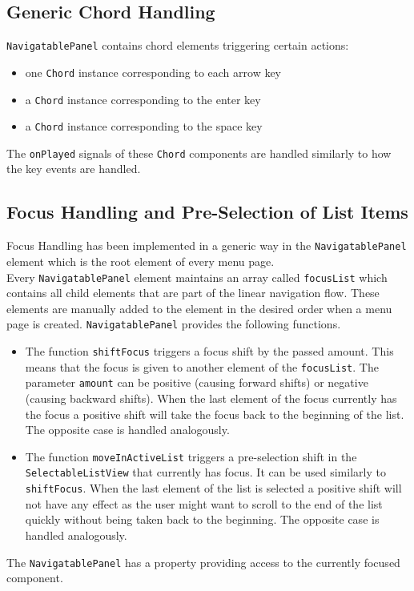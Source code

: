 \subsection{Generic Chord Handling}
{\tt NavigatablePanel} contains chord elements triggering certain actions: 
\begin {itemize}
	\item {one {\tt Chord} instance corresponding to each arrow key}
	\item {a {\tt Chord} instance corresponding to the enter key}
	\item {a {\tt Chord} instance corresponding to the space key}
\end {itemize}
The {\tt onPlayed} signals of these {\tt Chord} components are handled similarly to how the key events are handled.
\subsection{Focus Handling and Pre-Selection of List Items}
Focus Handling has been implemented in a generic way in the {\tt NavigatablePanel} element which is the root element of every menu page. \\
Every {\tt NavigatablePanel} element maintains an array called {\tt focusList} which contains all child elements that are part of the linear navigation flow. These elements are manually added to the element in the desired order when a menu page is created.
{\tt NavigatablePanel} provides the following functions.
\begin {itemize}
	\item {
		The function {\tt shiftFocus} triggers a focus shift by the passed amount. This means that the focus is given to another element of the {\tt focusList}. The parameter {\tt amount} can be positive (causing forward shifts) or negative (causing backward shifts). When the last element of the focus currently has the focus a positive shift will take the focus back to the beginning of the list. The opposite case is handled analogously.
	}
	\item {
		The function {\tt moveInActiveList} triggers a pre-selection shift in the {\tt SelectableListView} that currently has focus. It can be used similarly to {\tt shiftFocus}. When the last element of the list is selected a positive shift will not have any effect as the user might want to scroll to the end of the list quickly without being taken back to the beginning. The opposite case is handled analogously.
	}
\end {itemize}
The {\tt NavigatablePanel} has a property providing access to the currently focused component.

